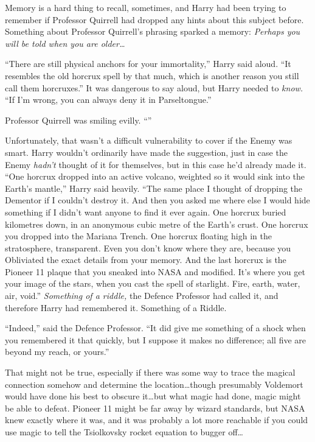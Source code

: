 Memory is a hard thing to recall, sometimes, and Harry had been trying to remember if Professor Quirrell had dropped any hints about this subject before. Something about Professor Quirrell’s phrasing sparked a memory: \emph{Perhaps you will be told when you are older…}

“There are still physical anchors for your immortality,” Harry said aloud. “It resembles the old horcrux spell by that much, which is another reason you still call them horcruxes.” It was dangerous to say aloud, but Harry needed to \emph{know.} “If I’m wrong, you can always deny it in Parseltongue.”

Professor Quirrell was smiling evilly. “”

Unfortunately, that wasn’t a difficult vulnerability to cover if the Enemy was smart. Harry wouldn’t ordinarily have made the suggestion, just in case the Enemy \emph{hadn’t} thought of it for themselves, but in this case he’d already made it. “One horcrux dropped into an active volcano, weighted so it would sink into the Earth’s mantle,” Harry said heavily. “The same place I thought of dropping the Dementor if I couldn’t destroy it. And then you asked me where else I would hide something if I didn’t want anyone to find it ever again. One horcrux buried kilometres down, in an anonymous cubic metre of the Earth’s crust. One horcrux you dropped into the Mariana Trench. One horcrux floating high in the stratosphere, transparent. Even you don’t know where they are, because you Obliviated the exact details from your memory. And the last horcrux is the Pioneer 11 plaque that you sneaked into NASA and modified. It’s where you get your image of the stars, when you cast the spell of starlight. Fire, earth, water, air, void.” \emph{Something of a riddle,} the Defence Professor had called it, and therefore Harry had remembered it. Something of a Riddle.

“Indeed,” said the Defence Professor. “It did give me something of a shock when you remembered it that quickly, but I suppose it makes no difference; all five are beyond my reach, or yours.”

That might not be true, especially if there was some way to trace the magical connection somehow and determine the location…though presumably Voldemort would have done his best to obscure it…but what magic had done, magic might be able to defeat. Pioneer 11 might be far away by wizard standards, but NASA knew exactly where it was, and it was probably a lot more reachable if you could use magic to tell the Tsiolkovsky rocket equation to bugger off…

